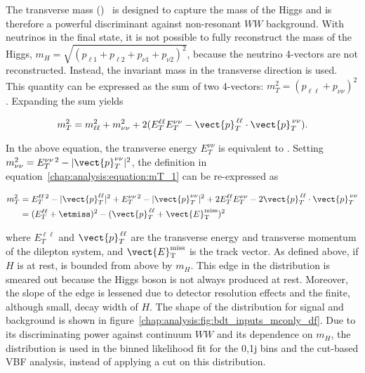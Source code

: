 The transverse mass (\mT)~\cite{bib:PhysRevD:43779,bib:Barr:2009mx} is
designed to capture the mass of the Higgs and is therefore a powerful
discriminant against non-resonant $WW$ background. With neutrinos in
the final state, it is not possible to fully reconstruct the mass of
the Higgs, $m_H = \sqrt{(p_{\ell 1} + p_{\ell 2} + p_{\nu 1} + p_{\nu
2})^2}$, because the neutrino 4-vectors are not reconstructed. Instead,
the invariant mass in the transverse direction is used. This quantity
can be expressed as the sum of two 4-vectors: $m_T^2 = (p_{\ell\ell} +
p_{\nu\nu})^2$. Expanding the sum yields

\begin{equation}
\label{chap:analysis:equation:mT_1}
m_T^2 = m_{\ell\ell}^2 + m_{\nu\nu}^2 +
2(E_{T}^{\ell\ell}E_{T}^{\nu\nu}-\vect{p}_T^{\,\ell\ell}\cdot\vect{p}_T^{\,\nu\nu}).
\end{equation}

\noindent In the above equation, the transverse energy $E_{T}^{\nu\nu}$
is equivalent to \etmiss. Setting $m_{\nu\nu}^2 = E_{T}^{\nu\nu\,2} -
|\vect{p}_T^{\nu\nu}|^2$, the definition in
equation~\ref{chap:analysis:equation:mT_1} can be re-expressed as

\begin{equation}
\begin{aligned}
\label{chap:analysis:equation:mT_2}
m_T^2 & = E_{T}^{\ell\ell\,2} - |\vect{p}_T^{\ell\ell}|^2 +
E_{T}^{\nu\nu\,2} - |\vect{p}_T^{\nu\nu}|^2 +
2E_{T}^{\ell\ell}E_{T}^{\nu\nu} -
2\vect{p}_T^{\,\ell\ell}\cdot\vect{p}_T^{\,\nu\nu} \\
& = (E_{T}^{\ell\ell} + \etmiss)^2 - (\vect{p}_T^{\,\ell\ell} +
\vect{E}_{\mathrm{T}}^{\rm miss})^2
\end{aligned}
\end{equation}

\noindent
where $E_{T}^{\ell\ell}$ and $\vect{p}_T^{\,\ell\ell}$ are the transverse
energy and transverse momentum of the dilepton system,
and $\vect{E}_{\mathrm{T}}^{\rm miss}$ is the track \etmiss vector. As defined
above, if $H$ is at rest, \mT is bounded from above by $m_H$. This
edge in the distribution is smeared out because the Higgs boson is not
always produced at rest. Moreover, the slope of the edge is lessened due to
detector resolution effects and the finite, although small, decay
width of $H$. The shape of the distribution for signal and background
is shown in figure~\ref{chap:analysis:fig:bdt_inputs_mconly_df}. Due to its discriminating power against
continuum $WW$ and its dependence on $m_H$, the \mT distribution is
used in the binned likelihood fit for the 0,1j bins and the cut-based VBF
analysis, instead of applying a cut on this distribution. 

